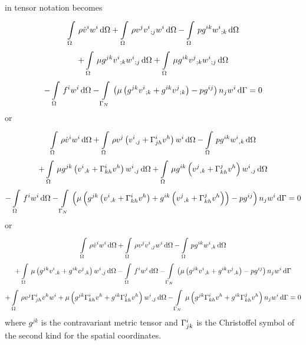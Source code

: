  in tensor notation becomes
\begin{multline}
  \gint{\Omega}{}{\rho\dot{v}^{i}w^{i}}{\Omega}
 +\gint{\Omega}{}{\rho v^{j}\covarderiv{v^{i}}{j}w^{i}}{\Omega}
 -\gint{\Omega}{}{pg^{ik}\covarderiv{w^{i}}{k}}{\Omega}\\
 +\gint{\Omega}{}{{\mu}g^{jk}\covarderiv{v^{i}}{k}\covarderiv{w^{i}}{j}}{\Omega}
 +\gint{\Omega}{}{{\mu}g^{ik}\covarderiv{v^{j}}{k}\covarderiv{w^{i}}{j}}{\Omega}\\
 -\gint{\Omega}{}{f^{i}w^{i}}{\Omega}
 -\gint{\Gamma_N}{}{\pbrac{\mu\pbrac{g^{jk}\covarderiv{v^{i}}{k}+g^{ik}\covarderiv{v^{j}}{k}}-pg^{ij}}n_{j}w^{i}}{\Gamma}=0
 \label{eqn:TensorNSE}
\end{multline}
or
\begin{multline}
  \gint{\Omega}{}{\rho\dot{v}^{i}w^{i}}{\Omega}
 +\gint{\Omega}{}{\rho v^{j}\pbrac{\partialderiv{v^{i}}{j}+\christoffel{i}{j}{h}v^{h}}w^{i}}{\Omega}
 -\gint{\Omega}{}{pg^{ik}\partialderiv{w^{i}}{k}}{\Omega}\\
 +\gint{\Omega}{}{{\mu}g^{jk}\pbrac{\partialderiv{v^{i}}{k}+\christoffel{i}{k}{h}v^{h}}\partialderiv{w^{i}}{j}}{\Omega}
 +\gint{\Omega}{}{{\mu}g^{ik}\pbrac{\partialderiv{v^{j}}{k}+\christoffel{j}{k}{h}v^{h}}\partialderiv{w^{i}}{j}}{\Omega}\\
 -\gint{\Omega}{}{f^{i}w^{i}}{\Omega}
 -\gint{\Gamma_N}{}{\pbrac{\mu\pbrac{g^{jk}\pbrac{\partialderiv{v^{i}}{k}+\christoffel{i}{k}{h}v^{h}}+g^{ik}\pbrac{\partialderiv{v^{j}}{k}+\christoffel{j}{k}{h}v^{h}}}-pg^{ij}}n_{j}w^{i}}{\Gamma}=0
 \label{eqn:Tensor2NSE}
\end{multline}
or
\begin{multline}
  \gint{\Omega}{}{\rho\dot{v}^{i}w^{i}}{\Omega}
 +\gint{\Omega}{}{\rho v^{j}\partialderiv{v^{i}}{j}w^{i}}{\Omega}
 -\gint{\Omega}{}{pg^{ik}\partialderiv{w^{i}}{k}}{\Omega}\\
 +\gint{\Omega}{}{\mu\pbrac{g^{jk}\partialderiv{v^{i}}{k}+g^{ik}\partialderiv{v^{j}}{k}}\partialderiv{w^{i}}{j}}{\Omega}
 -\gint{\Omega}{}{f^{i}w^{i}}{\Omega}
 -\gint{\Gamma_N}{}{\pbrac{\mu\pbrac{g^{jk}\partialderiv{v^{i}}{k}+g^{ik}\partialderiv{v^{j}}{k}}-pg^{ij}}n_{j}w^{i}}{\Gamma}\\
 +\gint{\Omega}{}{\rho v^{j}\christoffel{i}{j}{h}v^{h}w^{i}+\mu\pbrac{g^{jk}\christoffel{i}{k}{h}v^{h}+
     g^{ik}\christoffel{j}{k}{h}v^{h}}\partialderiv{w^{i}}{j}}{\Omega}
 -\gint{\Gamma_N}{}{\mu\pbrac{g^{jk}\christoffel{i}{k}{h}v^{h}+g^{ik}\christoffel{j}{k}{h}v^{h}}n_{j}w^{i}}{\Gamma}=0
 \label{eqn:Tensor3NSE}
\end{multline}
where $g^{jk}$ is the contravariant metric tensor and $ \Gamma^{i}_{jk} $
is the Christoffel symbol of the second kind for the spatial coordinates.

